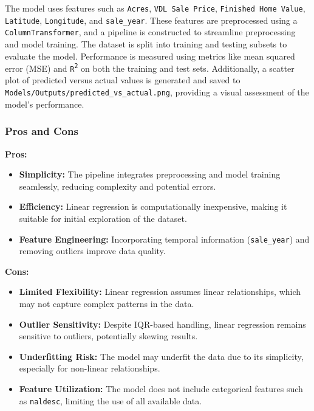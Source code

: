 The model uses features such as \texttt{Acres}, \texttt{VDL Sale Price}, \texttt{Finished Home Value}, \texttt{Latitude}, \texttt{Longitude}, and \texttt{sale\_year}. These features are preprocessed using a \texttt{ColumnTransformer}, and a pipeline is constructed to streamline preprocessing and model training. The dataset is split into training and testing subsets to evaluate the model. Performance is measured using metrics like mean squared error (MSE) and \texttt{R\textsuperscript{2}} on both the training and test sets. Additionally, a scatter plot of predicted versus actual values is generated and saved to \texttt{Models/Outputs/predicted\_vs\_actual.png}, providing a visual assessment of the model's performance.

\subsubsection*{Pros and Cons}

\textbf{Pros:}
\begin{itemize}
    \item \textbf{Simplicity:} The pipeline integrates preprocessing and model training seamlessly, reducing complexity and potential errors.
    \item \textbf{Efficiency:} Linear regression is computationally inexpensive, making it suitable for initial exploration of the dataset.
    \item \textbf{Feature Engineering:} Incorporating temporal information (\texttt{sale\_year}) and removing outliers improve data quality.
\end{itemize}

\textbf{Cons:}
\begin{itemize}
    \item \textbf{Limited Flexibility:} Linear regression assumes linear relationships, which may not capture complex patterns in the data.
    \item \textbf{Outlier Sensitivity:} Despite IQR-based handling, linear regression remains sensitive to outliers, potentially skewing results.
    \item \textbf{Underfitting Risk:} The model may underfit the data due to its simplicity, especially for non-linear relationships.
    \item \textbf{Feature Utilization:} The model does not include categorical features such as \texttt{naldesc}, limiting the use of all available data.
\end{itemize}

